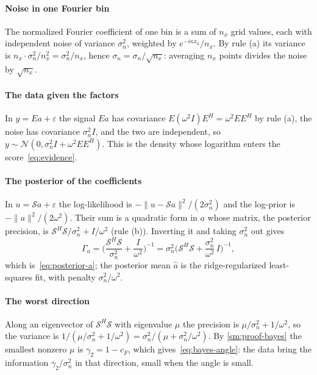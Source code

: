\documentclass[11pt]{article}
\theoremstyle{plain}
\theoremstyle{definition}
\theoremstyle{remark}
\newcommand{\sumop}{\mathcal{S}}            %
\newcommand{\cF}{c_{F}}                     %
\newcommand{\noise}{\sigma_{n}}             %
\newcommand{\sigbin}{\sigma_{\kappa}}       %
\newcommand{\Normal}{\mathcal{N}}
\newcommand{\norm}[1]{\lVert#1\rVert}
\begin{document}
\paragraph{Noise in one Fourier bin} The normalized Fourier coefficient of one bin is a sum of $n_x$ grid values, each
with independent noise of variance $\noise^2$, weighted by $e^{-i\kappa x_k}/n_x$. By rule (a) its variance is
$n_x\cdot\noise^2/n_x^2=\noise^2/n_x$, hence $\sigbin=\noise/\sqrt{n_x}$: averaging $n_x$ points divides the noise by
$\sqrt{n_x}$.

\paragraph{The data given the factors} In $y=Ea+\varepsilon$ the signal $Ea$ has covariance $E(\omega^2I)E^H=\omega^2EE^H$ by
rule (a), the noise has covariance $\noise^2I$, and the two are independent, so $y\sim\Normal(0,\noise^2I+\omega^2EE^H)$. This
is the density whose logarithm enters the score~\eqref{eq:evidence}.

\paragraph{The posterior of the coefficients} In $u=\sumop a+\varepsilon$ the log-likelihood is
$-\norm{u-\sumop a}^2/(2\noise^2)$ and the log-prior is $-\norm{a}^2/(2\omega^2)$. Their sum is a quadratic form in $a$ whose
matrix, the posterior precision, is $\sumop^H\sumop/\noise^2+I/\omega^2$ (rule (b)). Inverting it and taking $\noise^2$ out gives
\[
  \Gamma_a=\Big(\frac{\sumop^H\sumop}{\noise^2}+\frac{I}{\omega^2}\Big)^{-1}=\noise^2\Big(\sumop^H\sumop+\frac{\noise^2}{\omega^2}\,I\Big)^{-1},
\]
which is~\eqref{eq:posterior-a}; the posterior mean $\hat a$ is the ridge-regularized least-squares fit, with
penalty $\noise^2/\omega^2$.

\paragraph{The worst direction} Along an eigenvector of $\sumop^H\sumop$ with eigenvalue $\mu$ the precision is
$\mu/\noise^2+1/\omega^2$, so the variance is $1/(\mu/\noise^2+1/\omega^2)=\noise^2/(\mu+\noise^2/\omega^2)$. By
\cref{sm:proof-bayes} the smallest nonzero $\mu$ is $\gamma_2=1-\cF$, which gives~\eqref{eq:bayes-angle}: the data bring
the information $\gamma_2/\noise^2$ in that direction, small when the angle is small.
\end{document}
